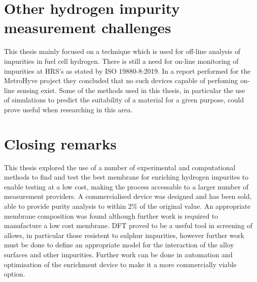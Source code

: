 \section{Other hydrogen impurity measurement challenges}
This thesis mainly focused on a technique which is used for off-line analysis of impurities in fuel cell hydrogen. There is still a need for on-line monitoring of impurities at HRS's as stated by ISO 19880-8:2019. In a report performed for the MetroHyve project they concluded that no such devices capable of perfoming on-line sensing exist. Some of the methods used in this thesis, in particular the use of simulations to predict the suitability of a material for a given purpose, could prove useful when researching in this area. 

\section{Closing remarks}
This thesis explored the use of a number of experimental and computational methods to find and test the best membrane for enriching hydrogen impurites to enable testing at a low cost, making the process accessable to a larger number of measurement providers. A commercialised device was designed and has been sold, able to provide purity analysis to within 2\% of the original value. An appropriate membrane composition was found although further work is required to manufacture a low cost membrane. DFT proved to be a useful tool in screening of allows, in particular those resistent to sulphur impurities, however further work must be done to define an appropriate model for the interaction of the alloy surfaces and other impurities. Further work can be done in automation and optimisation of the enrichment device to make it a more commercially viable option.



